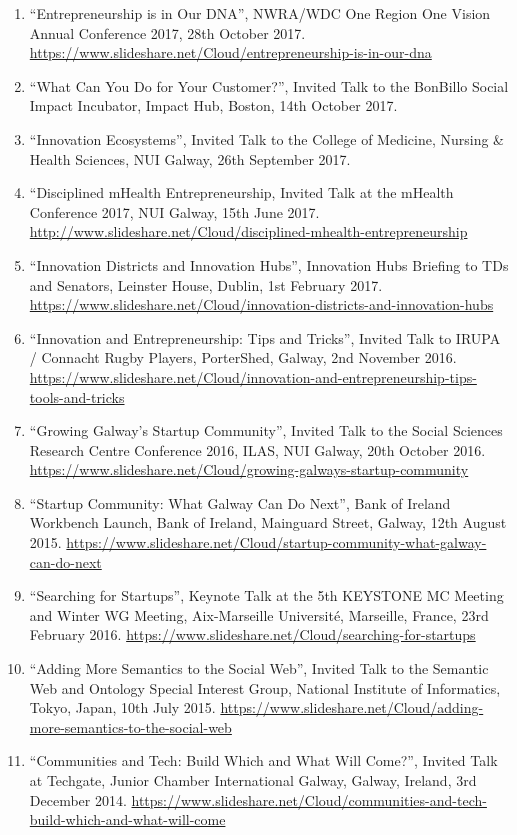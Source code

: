 \documentclass[10pt,a4paper]{res} %
\begin{document}
\begin{resume}
\begin{enumerate}
\item ``Entrepreneurship is in Our DNA'', NWRA/WDC One Region One Vision Annual Conference 2017, 28th October 2017. \url{https://www.slideshare.net/Cloud/entrepreneurship-is-in-our-dna}
\item ``What Can You Do for Your Customer?'', Invited Talk to the BonBillo Social Impact Incubator, Impact Hub, Boston, 14th October 2017.
\item ``Innovation Ecosystems'', Invited Talk to the College of Medicine, Nursing \& Health Sciences, NUI Galway, 26th September 2017.
\item ``Disciplined mHealth Entrepreneurship, Invited Talk at the mHealth Conference 2017, NUI Galway, 15th June 2017. \url{http://www.slideshare.net/Cloud/disciplined-mhealth-entrepreneurship}
\item ``Innovation Districts and Innovation Hubs'', Innovation Hubs Briefing to TDs and Senators, Leinster House, Dublin, 1st February 2017. \url{https://www.slideshare.net/Cloud/innovation-districts-and-innovation-hubs}
\item ``Innovation and Entrepreneurship: Tips and Tricks'', Invited Talk to IRUPA / Connacht Rugby Players, PorterShed, Galway, 2nd November 2016. \url{https://www.slideshare.net/Cloud/innovation-and-entrepreneurship-tips-tools-and-tricks}
\item ``Growing Galway's Startup Community'', Invited Talk to the Social Sciences Research Centre Conference 2016, ILAS, NUI Galway, 20th October 2016. \url{https://www.slideshare.net/Cloud/growing-galways-startup-community}
\item ``Startup Community: What Galway Can Do Next'', Bank of Ireland Workbench Launch, Bank of Ireland, Mainguard Street, Galway, 12th August 2015. \url{https://www.slideshare.net/Cloud/startup-community-what-galway-can-do-next}
\item ``Searching for Startups'', Keynote Talk at the 5th KEYSTONE MC Meeting and Winter WG Meeting, Aix-Marseille Universit\'{e}, Marseille, France, 23rd February 2016. \url{https://www.slideshare.net/Cloud/searching-for-startups}
\item ``Adding More Semantics to the Social Web'', Invited Talk to the Semantic Web and Ontology Special Interest Group, National Institute of Informatics, Tokyo, Japan, 10th July 2015. \url{https://www.slideshare.net/Cloud/adding-more-semantics-to-the-social-web}
\item ``Communities and Tech: Build Which and What Will Come?'', Invited Talk at Techgate, Junior Chamber International Galway, Galway, Ireland, 3rd December 2014. \url{https://www.slideshare.net/Cloud/communities-and-tech-build-which-and-what-will-come}

\end{enumerate}
\end{resume}
\end{document}
